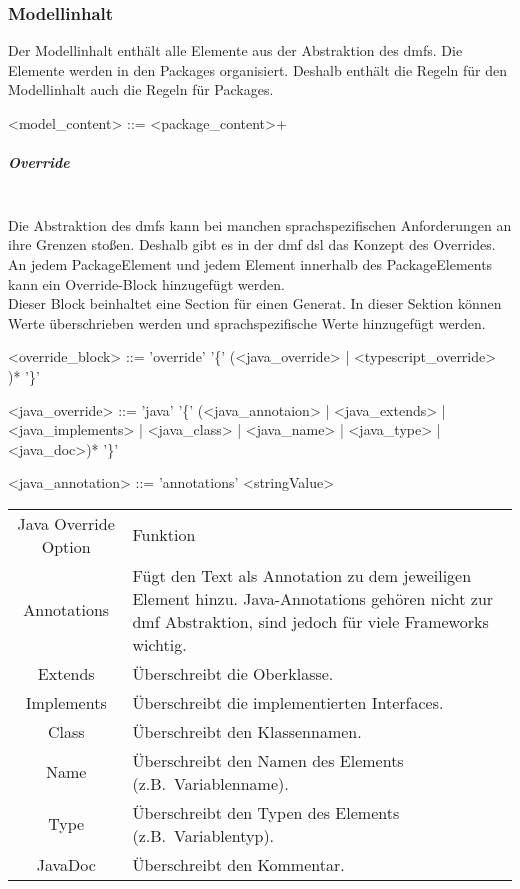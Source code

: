 \documentclass[./einleitung.tex]{subfiles}
\begin{document}
\subsubsection{Modellinhalt}
Der Modellinhalt enthält alle Elemente aus der Abstraktion des \acrshort{dmf}s.
Die Elemente werden in den Packages organisiert.
Deshalb enthält die Regeln für den Modellinhalt auch die Regeln für Packages.

\begin{grammar}
<model_content> ::= <package_content>+
\end{grammar}

\subparagraph{Override}\mbox{}\\
Die Abstraktion des \acrshort{dmf}s kann bei manchen sprachspezifischen Anforderungen an ihre Grenzen stoßen.
Deshalb gibt es in der \acrshort{dmf} \acrshort{dsl} das Konzept des Overrides.
An jedem PackageElement und jedem Element innerhalb des PackageElements kann ein Override-Block hinzugefügt werden. \\
Dieser Block beinhaltet eine Section für einen Generat.
In dieser Sektion können Werte überschrieben werden und sprachspezifische Werte hinzugefügt werden.\\
\begin{grammar}
<override_block> ::= 'override' '\{' (<java_override> | <typescript_override> )* '\}'

<java_override> ::= 'java' '\{' (<java_annotaion> | <java_extends> | <java_implements> | <java_class> | <java_name> | <java_type> | <java_doc>)* '\}'

<java_annotation> ::= 'annotations' <stringValue>
\end{grammar}
\begin{center}
\begin{tabular}{| c || m{30em} |}
\hline
Java Override Option & Funktion\\
\hhline{|=||=|}
Annotations & Fügt den Text als Annotation zu dem jeweiligen Element hinzu.
Java-Annotations gehören nicht zur \acrshort{dmf} Abstraktion, sind jedoch für viele Frameworks wichtig.\\
\hline
Extends & Überschreibt die Oberklasse.\\
\hline
Implements & Überschreibt die implementierten Interfaces.\\
\hline
Class & Überschreibt den Klassennamen.\\
\hline
Name & Überschreibt den Namen des Elements (z.B.\ Variablenname).\\
\hline
Type & Überschreibt den Typen des Elements (z.B.\ Variablentyp).\\
\hline
JavaDoc & Überschreibt den Kommentar.\\
\hline
\end{tabular}
\end{center}
\end{document}
